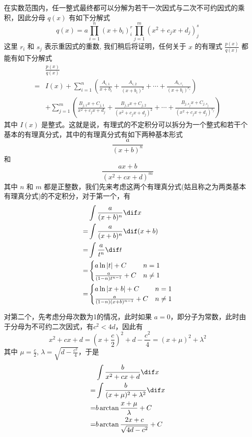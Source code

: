 在实数范围内，任一整式最终都可以分解为若干一次因式与二次不可约因式的乘积，因此分母 $q(x)$ 有如下分解式
\[ q(x) = a \prod_{i=1}^n(x+b_i)^r_i \prod_{j=1}^m(x^2+c_j x + d_j)^s_j \]
这里 $r_i$ 和 $s_j$ 表示重因式的重数, 我们稍后将证明，任何关于 $x$ 的有理式 $ \frac{p(x)}{q(x)} $ 都能有如下分解式
\begin{align*}
 & \frac{p(x)}{q(x)} \\
 = & I(x) + \sum_{i=1}^{n} \left( \frac{A_{i,1}}{x+b_i} + \frac{A_{i,2}}{(x+b_i)^2} + \cdots + \frac{A_{i,r_i}}{(x+b_i)^{r_i}}  \right) \\
 & + \sum_{j=1}^m \left( \frac{B_{j,1}x+C_{j,1}}{x^2+c_j x + d_j} + \frac{B_{j,2}x+C_{j,2}}{(x^2+c_j x + d_j)^2} + \cdots + \frac{B_{j,s_j}x+C_{j,s_j}}{(x^2+c_j x + d_j)^{s_j}} \right)
\end{align*}
其中 $I(x)$ 是整式。这就是说，有理式的不定积分可以拆分为一个整式和若干个基本的有理真分式，其中的有理真分式有如下两种基本形式
\[ \frac{a}{(x+b)^n} \]
和
\[ \frac{ax+b}{(x^2+cx+d)^m}  \]
其中 $n$ 和 $m$ 都是正整数，我们先来考虑这两个有理真分式(姑且称之为两类基本有理真分式)的不定积分，对于第一个，有
\begin{align*}
 & \int \frac{a}{(x+b)^n} \dif x \\
 = & \int \frac{a}{(x+b)^n}  \dif (x+b) \\
 = &\int \frac{a}{t^n} \dif t \\
 = & 
 \begin{cases}
    a\ln|t| + C & n=1 \\
    \frac{a}{(1-n)t^{n-1}} + C & n \neq 1
 \end{cases} \\
 = &
  \begin{cases}
    a\ln{|x+b|} + C & n=1 \\
    \frac{a}{(1-n)(x+b)^{n-1}} + C & n \neq 1
 \end{cases} \\
\end{align*}

对第二个，先考虑分母次数为1的情况，此时如果 $a=0$，即分子为常数，此时由于分母为不可约二次因式，有$c^2<4d$，因此有
\[ x^2+cx+d=\left(x+\frac{c}{2}\right)^2+d-\frac{c^2}{4} = (x+\mu)^2+\lambda^2 \]
其中 $\mu = \frac{c}{2}$, $\lambda = \sqrt{d-\frac{c^2}{4}}$，于是
\begin{align*}
 &  \int \frac{b}{x^2+cx+d} \dif x \\
  = & \int \frac{b}{(x+\mu)^2+\lambda^2} \dif x \\
  = & b \arctan{\frac{x+\mu}{\lambda}} + C \\
  = & b \arctan{\frac{2x+c}{\sqrt{4d-c^2}}} + C
\end{align*}

